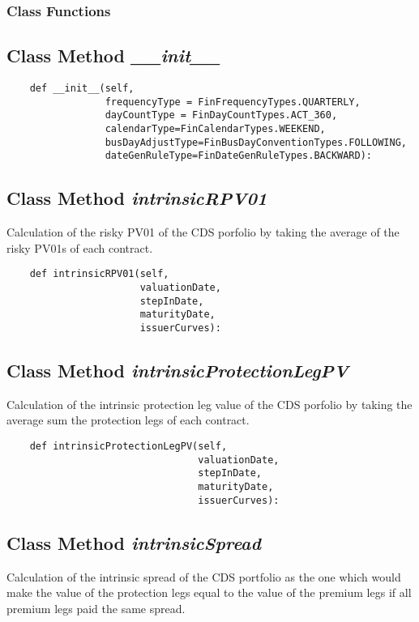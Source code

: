 \documentclass[twoside,11pt]{book}
\begin{document}
\subsubsection{Class Functions}

\subsection{Class Method {\it \_\_init\_\_}}


\begin{lstlisting}
    def __init__(self,
                 frequencyType = FinFrequencyTypes.QUARTERLY,
                 dayCountType = FinDayCountTypes.ACT_360,
                 calendarType=FinCalendarTypes.WEEKEND,
                 busDayAdjustType=FinBusDayConventionTypes.FOLLOWING,
                 dateGenRuleType=FinDateGenRuleTypes.BACKWARD):
\end{lstlisting}

\subsection{Class Method {\it intrinsicRPV01}}
Calculation of the risky PV01 of the CDS porfolio by taking the average of the risky PV01s of each contract. 

\begin{lstlisting}
    def intrinsicRPV01(self,
                       valuationDate,
                       stepInDate,
                       maturityDate,
                       issuerCurves):
\end{lstlisting}

\subsection{Class Method {\it intrinsicProtectionLegPV}}
Calculation of the intrinsic protection leg value of the CDS porfolio by taking the average sum the protection legs of each contract. 

\begin{lstlisting}
    def intrinsicProtectionLegPV(self,
                                 valuationDate,
                                 stepInDate,
                                 maturityDate,
                                 issuerCurves):
\end{lstlisting}

\subsection{Class Method {\it intrinsicSpread}}
Calculation of the intrinsic spread of the CDS portfolio as the one which would make the value of the protection legs equal to the value of the premium legs if all premium legs paid the same spread. 
\end{document}
